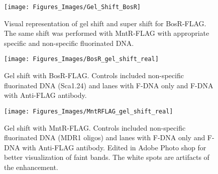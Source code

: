 \documentclass[12pt,twoside]{reedthesis}
\begin{document}
  		\begin{figure}[h!tbp]
  			
  			\centering
  			\texttt{[image: Figures\_Images/Gel\_Shift\_BosR]}
  			\caption[Gel Shift and Super Shift]{Visual representation of gel shift and super shift for BosR-FLAG. The same shift was performed with MntR-FLAG with appropriate specific and non-specific fluorinated DNA.}
  			\label{GelShift_Scheme}
  		\end{figure}

		\begin{figure}[h!tbp]
			
			\centering
			\texttt{[image: Figures\_Images/BosR\_gel\_shift\_real]}
			\caption[BosR-FLAG Gel Shift]{Gel shift with BosR-FLAG. Controls included non-specific fluorinated DNA (Sca1.24) and lanes with F-DNA only and F-DNA with Anti-FLAG antibody.}
			\label{GelShift_BosRFLAG}
		\end{figure}


		\begin{figure}[h!tbp]
			
			\centering
			\texttt{[image: Figures\_Images/MntRFLAG\_gel\_shift\_real]}
			\caption[MntR-FLAG Gel Shift]{Gel shift with MntR-FLAG. Controls included non-specific fluorinated DNA (MDR1 oligos) and lanes with F-DNA only and F-DNA with Anti-FLAG antibody. Edited in Adobe Photo shop for better visualization of faint bands. The white spots are artifacts of the enhancement.} 
			\label{GelShift_MntRFLAG}
		\end{figure}
\end{document}

